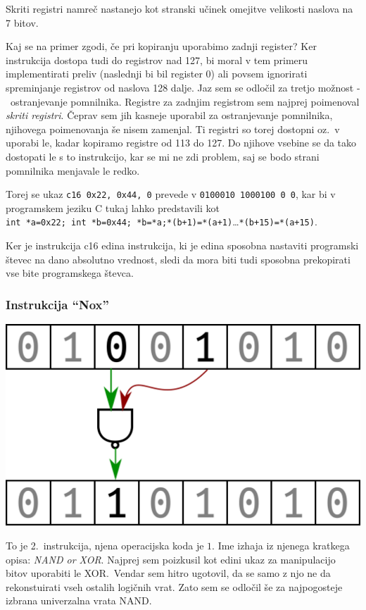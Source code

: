 \documentclass[12pt]{article}
\begin{document}
Skriti registri namreč nastanejo kot stranski učinek omejitve velikosti naslova na 7 bitov.

Kaj se na primer zgodi, če pri kopiranju uporabimo zadnji register?
Ker instrukcija dostopa tudi do registrov nad 127, bi moral v tem primeru implementirati preliv (naslednji bi bil register 0) ali povsem ignorirati spreminjanje registrov od naslova 128 dalje.
Jaz sem se odločil za tretjo možnost -\ ostranjevanje pomnilnika.
Registre za zadnjim registrom sem najprej poimenoval \textit{skriti registri}.
Čeprav sem jih kasneje uporabil za ostranjevanje pomnilnika, njihovega poimenovanja še nisem zamenjal.
Ti registri so torej dostopni oz.\ v uporabi le, kadar kopiramo registre od 113 do 127.
Do njihove vsebine se da tako dostopati le s to instrukcijo, kar se mi ne zdi problem, saj se bodo strani pomnilnika menjavale le redko.

Torej se ukaz \verb|c16 0x22, 0x44, 0| prevede v \verb|0100010 1000100 0 0|, kar bi v programskem jeziku C tukaj lahko predstavili kot \\
\verb|int *a=0x22; int *b=0x44; *b=*a;*(b+1)=*(a+1)|\ldots \verb|*(b+15)=*(a+15)|.

Ker je instrukcija c16 edina instrukcija, ki je edina sposobna nastaviti programski števec na dano absolutno vrednost, sledi da mora biti tudi sposobna prekopirati vse bite programskega števca.

\subsubsection{Instrukcija ``Nox''}

\begin{center}
  \includegraphics[width=.3\linewidth]{slike/predstavitev/nand.png}
\end{center}

To je 2.\ instrukcija, njena operacijska koda je $1$.
Ime izhaja iz njenega kratkega opisa: \textit{NAND or XOR}.
Najprej sem poizkusil kot edini ukaz za manipulacijo bitov uporabiti le XOR.\
Vendar sem hitro ugotovil, da se samo z njo ne da rekonstuirati vseh ostalih logičnih vrat.
Zato sem se odločil še za najpogosteje izbrana univerzalna vrata NAND.\@
\end{document}
